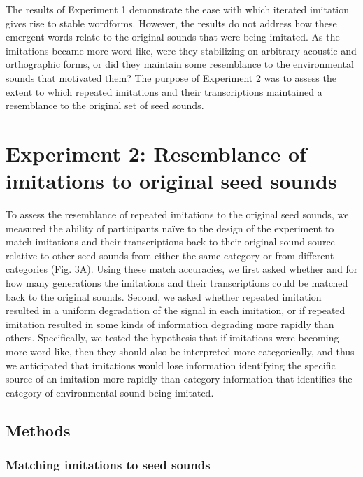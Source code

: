 \documentclass[english,floatsintext,man]{apa6}
\theoremstyle{definition}
\theoremstyle{definition}
\theoremstyle{definition}
\theoremstyle{remark}
\begin{document}
The results of Experiment 1 demonstrate the ease with which iterated
imitation gives rise to stable wordforms. However, the results do not
address how these emergent words relate to the original sounds that were
being imitated. As the imitations became more word-like, were they
stabilizing on arbitrary acoustic and orthographic forms, or did they
maintain some resemblance to the environmental sounds that motivated
them? The purpose of Experiment 2 was to assess the extent to which
repeated imitations and their transcriptions maintained a resemblance to
the original set of seed sounds.

\hypertarget{experiment-2-resemblance-of-imitations-to-original-seed-sounds}{%
\section{Experiment 2: Resemblance of imitations to original seed
sounds}\label{experiment-2-resemblance-of-imitations-to-original-seed-sounds}}

To assess the resemblance of repeated imitations to the original seed
sounds, we measured the ability of participants naïve to the design of
the experiment to match imitations and their transcriptions back to
their original sound source relative to other seed sounds from either
the same category or from different categories (Fig. 3A). Using these
match accuracies, we first asked whether and for how many generations
the imitations and their transcriptions could be matched back to the
original sounds. Second, we asked whether repeated imitation resulted in
a uniform degradation of the signal in each imitation, or if repeated
imitation resulted in some kinds of information degrading more rapidly
than others. Specifically, we tested the hypothesis that if imitations
were becoming more word-like, then they should also be interpreted more
categorically, and thus we anticipated that imitations would lose
information identifying the specific source of an imitation more rapidly
than category information that identifies the category of environmental
sound being imitated.

\hypertarget{methods-1}{%
\subsection{Methods}\label{methods-1}}

\hypertarget{matching-imitations-to-seed-sounds}{%
\subsubsection{Matching imitations to seed
sounds}\label{matching-imitations-to-seed-sounds}}
\end{document}

